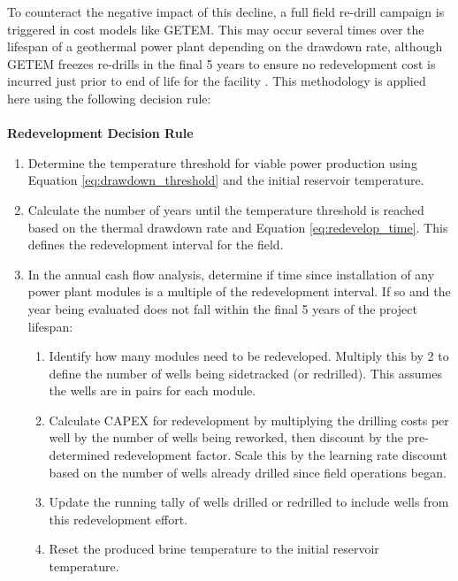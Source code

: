 To counteract the negative impact of this decline, a full field re-drill campaign is triggered in cost models like GETEM. This may occur several times over the lifespan of a geothermal power plant depending on the drawdown rate, although GETEM freezes re-drills in the final 5 years to ensure no redevelopment cost is incurred just prior to end of life for the facility \citep{entingh_volume_2006}. This methodology is applied here using the following decision rule:
\\
\\
\textbf{Redevelopment Decision Rule}\label{ch4:dr_redevelop}
\begin{enumerate}
	\item Determine the temperature threshold for viable power production using Equation \ref{eq:drawdown_threshold} and the initial reservoir temperature.
	\item Calculate the number of years until the temperature threshold is reached based on the thermal drawdown rate and Equation \ref{eq:redevelop_time}. This defines the redevelopment interval for the field.
    \item In the annual cash flow analysis, determine if time since installation of any power plant modules is a multiple of the redevelopment interval. If so and the year being evaluated does not fall within the final 5 years of the project lifespan:
	\begin{enumerate}
	    \item Identify how many modules need to be redeveloped. Multiply this by 2 to define the number of wells being sidetracked (or redrilled). This assumes the wells are in pairs for each module.
	    \item Calculate CAPEX for redevelopment by multiplying the drilling costs per well by the number of wells being reworked, then discount by the pre-determined redevelopment factor. Scale this by the learning rate discount based on the number of wells already drilled since field operations began.
	    \item Update the running tally of wells drilled or redrilled to include wells from this redevelopment effort.
	    \item Reset the produced brine temperature to the initial reservoir temperature.
    \end{enumerate}
\end{enumerate}

